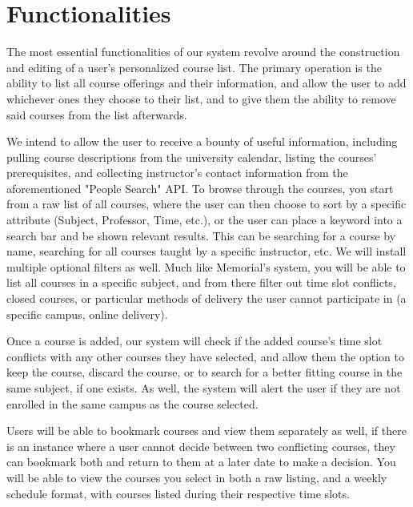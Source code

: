 \documentclass[12pt]{article}
\begin{document}
\section{Functionalities}
The most essential functionalities of our system revolve around the construction and editing of a user's personalized course list. The primary operation is the ability to list all course offerings and their 
information, and allow the user to add whichever ones they choose to their list, and to give them the ability to remove said courses from the list afterwards. \par
We intend to allow the user to receive a bounty of useful information, including pulling course descriptions from the university calendar, listing the courses' prerequisites, and collecting instructor's contact 
information from the aforementioned "People Search" API. To browse through the courses, you start from a raw list of all courses, where the user can then choose to sort by a specific attribute (Subject, Professor, Time, etc.), or the user can place a keyword into a search bar and be shown relevant results. This can be searching for a course by name, 
searching for all courses taught by a specific instructor, etc. We will install multiple optional filters as well. Much like Memorial's system, you will be able to list all courses in a specific subject, 
and from there filter out time slot conflicts, closed courses, or particular methods of delivery the user cannot participate in (a specific campus, online delivery).\par
Once a course is added, our system will check if the added course's time slot conflicts with any other courses they have selected, and allow them the option to keep the course, discard the course, or to search for a 
better fitting course in the same subject, if one exists. As well, the system will alert the user if they are not enrolled in the same campus as the course selected. \par
Users will be able to bookmark courses and view them separately as well, if there is an instance where a user cannot decide between two conflicting courses, they can bookmark both and return to them at a later date 
to make a decision. You will be able to view the courses you select in both a raw listing, and a weekly schedule format, with courses listed during their respective time slots.   
  
\end{document}

